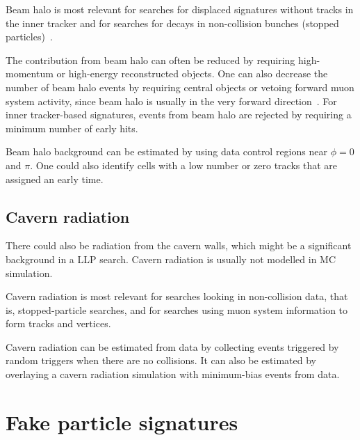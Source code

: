 Beam halo is most relevant for searches for displaced signatures without tracks in the inner tracker and for searches for decays in non-collision bunches (stopped particles)~\cite{Khachatryan:2015jha, Chatrchyan:2012dxa, Khachatryan:2010uf}.

The contribution from beam halo can often be reduced by requiring high-momentum or high-energy reconstructed objects. One can also decrease the number of beam halo events by requiring central objects or vetoing forward muon system activity, since beam halo is usually in the very forward direction~\cite{Khachatryan:2015jha, Chatrchyan:2012dxa, Khachatryan:2010uf}. For inner tracker-based signatures, events from beam halo are rejected by requiring a minimum number of early hits.

Beam halo background can be estimated by using data control regions near $\phi=0$ and $\pi$. One could also identify cells with a low number or zero tracks that are assigned an early time. %

\subsection{Cavern radiation} %

There could also be radiation from the cavern walls, which might be a significant background in a LLP search. %
Cavern radiation is usually not modelled in MC simulation.

Cavern radiation is most relevant for searches looking in non-collision data, that is, stopped-particle searches, and for searches using muon system information to form tracks and vertices.

Cavern radiation can be estimated from data by collecting events triggered by random triggers when there are no collisions. It can also be estimated by overlaying a cavern radiation simulation with minimum-bias events from data.


\section{Fake particle signatures} %

